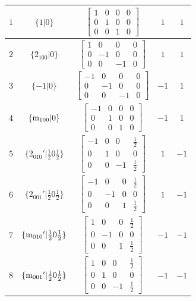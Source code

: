 \documentclass[fleqn,8pt]{jsarticle}
\begin{document}
\begin{longtable}{ccccc}
$ 1 $ & $ \{1|0\} $ & $ \begin{bmatrix} 1 & 0 & 0 & 0 \\ 0 & 1 & 0 & 0 \\ 0 & 0 & 1 & 0 \end{bmatrix} $ & $ 1 $ & $ 1 $ \\ \hline
$ 2 $ & $ \{2{}_{100}|0\} $ & $ \begin{bmatrix} 1 & 0 & 0 & 0 \\ 0 & -1 & 0 & 0 \\ 0 & 0 & -1 & 0 \end{bmatrix} $ & $ 1 $ & $ 1 $ \\ \hline
$ 3 $ & $ \{-1|0\} $ & $ \begin{bmatrix} -1 & 0 & 0 & 0 \\ 0 & -1 & 0 & 0 \\ 0 & 0 & -1 & 0 \end{bmatrix} $ & $ -1 $ & $ 1 $ \\ \hline
$ 4 $ & $ \{{\rm m}_{100}|0\} $ & $ \begin{bmatrix} -1 & 0 & 0 & 0 \\ 0 & 1 & 0 & 0 \\ 0 & 0 & 1 & 0 \end{bmatrix} $ & $ -1 $ & $ 1 $ \\ \hline
$ 5 $ & $ \{2{}_{010}{}'|\frac{1}{2} 0 \frac{1}{2}\} $ & $ \begin{bmatrix} -1 & 0 & 0 & \frac{1}{2} \\ 0 & 1 & 0 & 0 \\ 0 & 0 & -1 & \frac{1}{2} \end{bmatrix} $ & $ 1 $ & $ -1 $ \\ \hline
$ 6 $ & $ \{2{}_{001}{}'|\frac{1}{2} 0 \frac{1}{2}\} $ & $ \begin{bmatrix} -1 & 0 & 0 & \frac{1}{2} \\ 0 & -1 & 0 & 0 \\ 0 & 0 & 1 & \frac{1}{2} \end{bmatrix} $ & $ 1 $ & $ -1 $ \\ \hline
$ 7 $ & $ \{{\rm m}_{010}{}'|\frac{1}{2} 0 \frac{1}{2}\} $ & $ \begin{bmatrix} 1 & 0 & 0 & \frac{1}{2} \\ 0 & -1 & 0 & 0 \\ 0 & 0 & 1 & \frac{1}{2} \end{bmatrix} $ & $ -1 $ & $ -1 $ \\ \hline
$ 8 $ & $ \{{\rm m}_{001}{}'|\frac{1}{2} 0 \frac{1}{2}\} $ & $ \begin{bmatrix} 1 & 0 & 0 & \frac{1}{2} \\ 0 & 1 & 0 & 0 \\ 0 & 0 & -1 & \frac{1}{2} \end{bmatrix} $ & $ -1 $ & $ -1 $ \\
\end{longtable}
\end{document}

